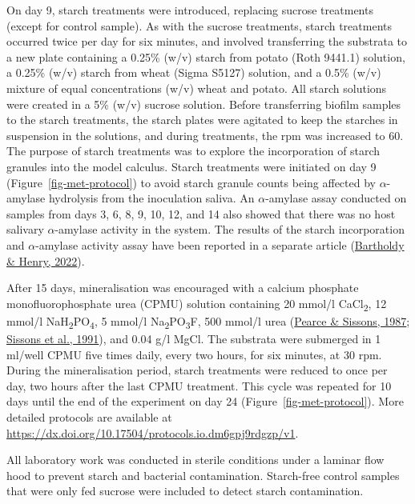 \documentclass[
  b5paper,
]{book}
\begin{document}
On day 9, starch treatments were introduced, replacing sucrose
treatments (except for control sample). As with the sucrose treatments,
starch treatments occurred twice per day for six minutes, and involved
transferring the substrata to a new plate containing a 0.25\% (w/v)
starch from potato (Roth 9441.1) solution, a 0.25\% (w/v) starch from
wheat (Sigma S5127) solution, and a 0.5\% (w/v) mixture of equal
concentrations (w/v) wheat and potato. All starch solutions were created
in a 5\% (w/v) sucrose solution. Before transferring biofilm samples to
the starch treatments, the starch plates were agitated to keep the
starches in suspension in the solutions, and during treatments, the rpm
was increased to 60. The purpose of starch treatments was to explore the
incorporation of starch granules into the model calculus. Starch
treatments were initiated on day 9 (Figure~\ref{fig-met-protocol}) to
avoid starch granule counts being affected by \(\alpha\)-amylase
hydrolysis from the inoculation saliva. An \(\alpha\)-amylase assay
conducted on samples from days 3, 6, 8, 9, 10, 12, and 14 also showed
that there was no host salivary \(\alpha\)-amylase activity in the
system. The results of the starch incorporation and \(\alpha\)-amylase
activity assay have been reported in a separate article
(\protect\hyperlink{ref-bartholdyInvestigatingBiases2022}{Bartholdy \&
Henry, 2022}).

After 15 days, mineralisation was encouraged with a calcium phosphate
monofluorophosphate urea (CPMU) solution containing 20 mmol/l
CaCl\textsubscript{2}, 12 mmol/l
NaH\textsubscript{2}PO\textsubscript{4}, 5 mmol/l
Na\textsubscript{2}PO\textsubscript{3}F, 500 mmol/l urea
(\protect\hyperlink{ref-pearceConcomitantDeposition1987}{Pearce \&
Sissons, 1987};
\protect\hyperlink{ref-sissonsMultistationPlaque1991}{Sissons et al.,
1991}), and 0.04 g/l MgCl. The substrata were submerged in 1 ml/well
CPMU five times daily, every two hours, for six minutes, at 30 rpm.
During the mineralisation period, starch treatments were reduced to once
per day, two hours after the last CPMU treatment. This cycle was
repeated for 10 days until the end of the experiment on day 24
(Figure~\ref{fig-met-protocol}). More detailed protocols are available
at \url{https://dx.doi.org/10.17504/protocols.io.dm6gpj9rdgzp/v1}.

All laboratory work was conducted in sterile conditions under a laminar
flow hood to prevent starch and bacterial contamination. Starch-free
control samples that were only fed sucrose were included to detect
starch contamination.
\end{document}
